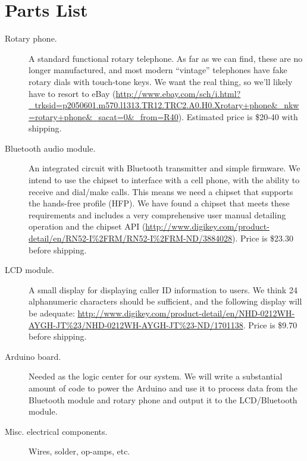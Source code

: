 \documentclass[11pt]{article}
\begin{document}
    \section{Parts List}
        \begin{description}
            \item[Rotary phone.] A standard functional rotary telephone. As far as we can find, these are no longer manufactured, and most modern ``vintage'' telephones have fake rotary dials with touch-tone keys. We want the real thing, so we'll likely have to resort to eBay (\url{http://www.ebay.com/sch/i.html?_trksid=p2050601.m570.l1313.TR12.TRC2.A0.H0.Xrotary+phone&_nkw=rotary+phone&_sacat=0&_from=R40}). Estimated price is \$20-40 with shipping.
            \item[Bluetooth audio module.] An integrated circuit with Bluetooth transmitter and simple firmware. We intend to use the chipset to interface with a cell phone, with the ability to receive and dial/make calls. This means we need a chipset that supports the hands-free profile (HFP). We have found a chipset that meets these requirements and includes a very comprehensive user manual detailing operation and the chipset API (\url{http://www.digikey.com/product-detail/en/RN52-I%2FRM/RN52-I%2FRM-ND/3884028}). Price is \$23.30 before shipping.
            \item[LCD module.] A small display for displaying caller ID information to users. We think 24 alphanumeric characters should be sufficient, and the following display will be adequate: \url{http://www.digikey.com/product-detail/en/NHD-0212WH-AYGH-JT%23/NHD-0212WH-AYGH-JT%23-ND/1701138}. Price is \$9.70 before shipping.
            \item[Arduino board.] Needed as the logic center for our system. We will write a substantial amount of code to power the Arduino and use it to process data from the Bluetooth module and rotary phone and output it to the LCD/Bluetooth module.
            \item[Misc. electrical components.] Wires, solder, op-amps, etc.
        \end{description}
\end{document}

